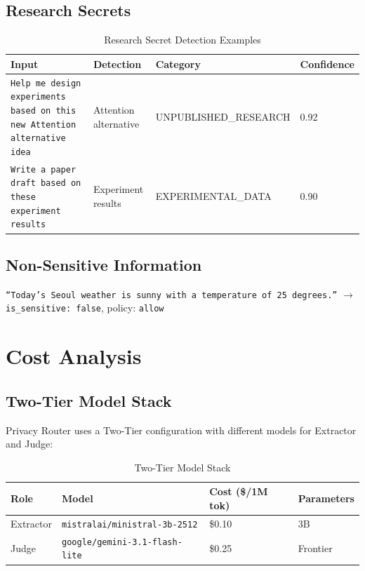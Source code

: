 \documentclass[11pt,a4paper]{article}
\begin{document}
\subsection{Research Secrets}

\begin{table}[h]
\centering
\begin{tabular}{@{}p{5cm}lll@{}}
\toprule
Input & Detection & Category & Confidence \\
\midrule
\texttt{Help me design experiments based on this new Attention alternative idea} & Attention alternative & UNPUBLISHED\_RESEARCH & 0.92 \\
\texttt{Write a paper draft based on these experiment results} & Experiment results & EXPERIMENTAL\_DATA & 0.90 \\
\bottomrule
\end{tabular}
\caption{Research Secret Detection Examples}
\end{table}

\subsection{Non-Sensitive Information}

\texttt{``Today's Seoul weather is sunny with a temperature of 25 degrees.''} $\rightarrow$ \texttt{is\_sensitive: false}, policy: \texttt{allow}

\section{Cost Analysis}

\subsection{Two-Tier Model Stack}

Privacy Router uses a Two-Tier configuration with different models for Extractor and Judge:

\begin{table}[h]
\centering
\begin{tabular}{@{}llll@{}}
\toprule
Role & Model & Cost (\$/1M tok) & Parameters \\
\midrule
Extractor & \texttt{mistralai/ministral-3b-2512} & \$0.10 & 3B \\
Judge & \texttt{google/gemini-3.1-flash-lite} & \$0.25 & Frontier \\
\bottomrule
\end{tabular}
\caption{Two-Tier Model Stack}
\end{table}
\end{document}
